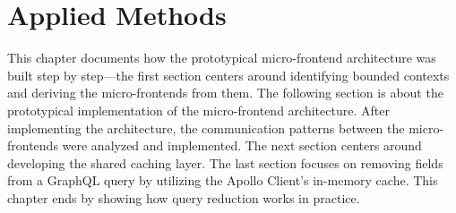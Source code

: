 \chapter{Applied Methods}\label{chapter:applied-methods}

This chapter documents how the prototypical micro-frontend architecture was built step by step—the first section centers around identifying bounded contexts and deriving the micro-frontends from them. The following section is about the prototypical implementation of the micro-frontend architecture. After implementing the architecture, the communication patterns between the micro-frontends were analyzed and implemented. The next section centers around developing the shared caching layer. The last section focuses on removing fields from a GraphQL query by utilizing the Apollo Client's in-memory cache. This chapter ends by showing how query reduction works in practice.







